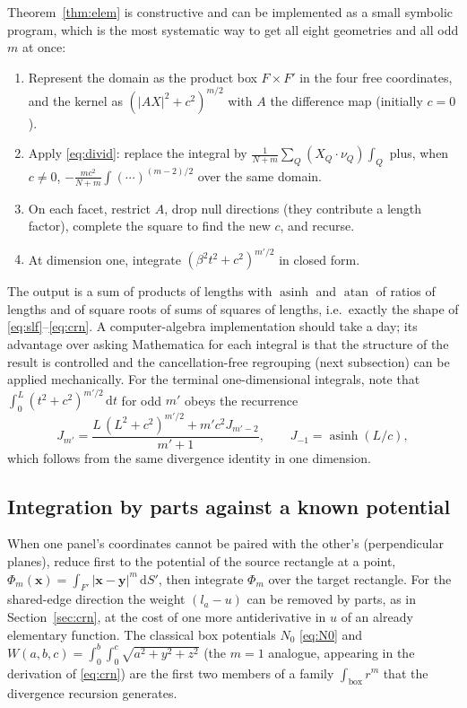 \documentclass[11pt]{article}
\theoremstyle{remark}
\newcommand{\dd}{\mathrm{d}}
\newcommand{\asinh}{\operatorname{asinh}}
\newcommand{\atan}{\operatorname{atan}}
\begin{document}
Theorem~\ref{thm:elem} is constructive and can be implemented as a small symbolic
program, which is the most systematic way to get all eight geometries and all odd
$m$ at once:
\begin{enumerate}[nosep]
\item Represent the domain as the product box $F\times F'$ in the four free
coordinates, and the kernel as $(|AX|^2 + c^2)^{m/2}$ with $A$ the difference map
(initially $c = 0$).
\item Apply \eqref{eq:divid}: replace the integral by $\frac{1}{N+m}\sum_Q (X_Q\cdot\nu_Q)\int_Q$
plus, when $c\ne 0$, $-\frac{m c^2}{N+m}\int (\cdots)^{(m-2)/2}$ over the same domain.
\item On each facet, restrict $A$, drop null directions (they contribute a length
factor), complete the square to find the new $c$, and recurse.
\item At dimension one, integrate $(\beta^2 t^2 + c^2)^{m'/2}$ in closed form.
\end{enumerate}
The output is a sum of products of lengths with $\asinh$ and $\atan$ of ratios of
lengths and of square roots of sums of squares of lengths, i.e.\ exactly the shape of
\eqref{eq:slf}--\eqref{eq:crn}. A computer-algebra implementation should take a day;
its advantage over asking Mathematica for each integral is that the structure of the
result is controlled and the cancellation-free regrouping (next subsection) can be
applied mechanically. For the terminal one-dimensional integrals, note that $\int_0^L
(t^2+c^2)^{m'/2}\,\dd t$ for odd $m'$ obeys the recurrence
\begin{equation}
J_{m'} = \frac{L\,(L^2+c^2)^{m'/2} + m' c^2 J_{m'-2}}{m'+1},\qquad
J_{-1} = \asinh(L/c),
\end{equation}
which follows from the same divergence identity in one dimension.

\subsection{Integration by parts against a known potential}

When one panel's coordinates cannot be paired with the other's (perpendicular
planes), reduce first to the potential of the source rectangle at a point,
$\Phi_m(\mathbf{x}) = \int_{F'} |\mathbf{x}-\mathbf{y}|^m\,\dd S'$, then integrate
$\Phi_m$ over the target rectangle. For the shared-edge direction the weight
$(l_a - u)$ can be removed by parts, as in Section~\ref{sec:crn}, at the cost of one
more antiderivative in $u$ of an already elementary function. The classical box
potentials $N_0$ \eqref{eq:N0} and $W(a,b,c) = \int_0^b\!\int_0^c\sqrt{a^2+y^2+z^2}$
(the $m=1$ analogue, appearing in the derivation of \eqref{eq:crn}) are the first two
members of a family $\int_{\text{box}} r^m$ that the divergence recursion generates.
\end{document}
